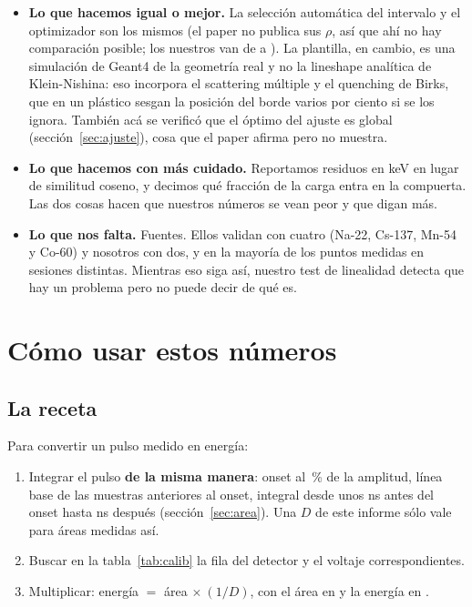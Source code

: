 \documentclass[11pt,a4paper]{article}
\begin{document}
\begin{itemize}
\item \textbf{Lo que hacemos igual o mejor.} La selección automática del
      intervalo y el optimizador son los mismos (el paper no publica sus $\rho$,
      así que ahí no hay comparación posible; los nuestros van de \RhoMin{} a
      \RhoMax). La plantilla, en cambio, es una simulación de Geant4 de la
      geometría real y no la lineshape analítica de Klein-Nishina: eso
      incorpora el scattering múltiple y el quenching de Birks, que en un
      plástico sesgan la posición del borde varios por ciento si se los ignora.
      También acá se verificó que el óptimo del ajuste es global
      (sección~\ref{sec:ajuste}), cosa que el paper afirma pero no muestra.
\item \textbf{Lo que hacemos con más cuidado.} Reportamos residuos en keV en
      lugar de similitud coseno, y decimos qué fracción de la carga entra en la
      compuerta. Las dos cosas hacen que nuestros números se vean peor y que
      digan más.
\item \textbf{Lo que nos falta.} Fuentes. Ellos validan con cuatro (Na-22,
      Cs-137, Mn-54 y Co-60) y nosotros con dos, y en la mayoría de los puntos
      medidas en sesiones distintas. Mientras eso siga así, nuestro test de
      linealidad detecta que hay un problema pero no puede decir de qué es.
\end{itemize}

\section{Cómo usar estos números}
\label{sec:uso}

\subsection{La receta}

Para convertir un pulso medido en energía:

\begin{enumerate}
\item Integrar el pulso \textbf{de la misma manera}: onset al \FracOnset\,\%
      de la amplitud, línea base de las muestras anteriores al onset, integral
      desde unos \PreMin{} ns antes del onset hasta \PostFijo{} ns después
      (sección~\ref{sec:area}). Una $D$ de este informe sólo vale para áreas
      medidas así.
\item Buscar en la tabla~\ref{tab:calib} la fila del detector y el voltaje
      correspondientes.
\item Multiplicar: energía $=$ área $\times\ (1/D)$, con el área en \mVns{} y
      la energía en \keVdep.
\end{enumerate}
\end{document}
